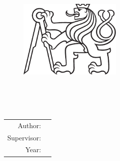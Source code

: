
\begin{center}
	\pagestyle{empty}
	{\LARGE \textsc \CVUT}\\[2ex]
	{\LARGE \textsc \FS}\\[4ex]
	{\Large \textsc \MECH}\\

	\vspace{2cm}
	\begin{figure}[h]
	\begin{center}
	  {\includegraphics[width=5cm]{Figures/Logo/symbol_cvut_konturova_verze_cb.pdf}}
	\end{center}
	\end{figure}
	\vspace{1cm}

	{\textbf {\Huge \ThesisType \\[6ex]}}
	{\LARGE \bf \ThesisTitle}\\[6ex]
	{\LARGE \ThesisTitleCZ}\\

	\vfill

	{\large
	\begin{tabular}{rl}
		Author: & \ThesisAuthor\\
		Supervisor: & \ThesisSupervisor\\
		Year: & \ThesisYear
	\end{tabular}
	}

	\newpage
\end{center}